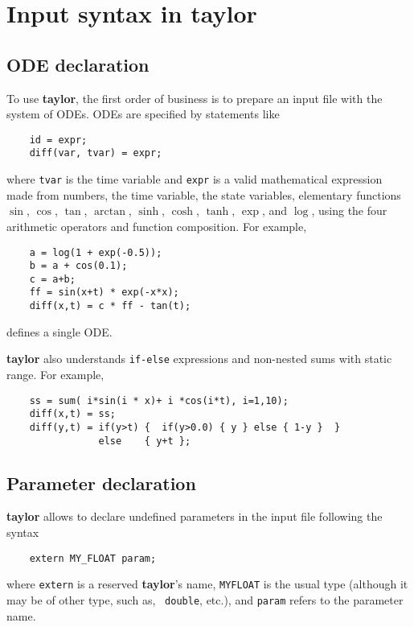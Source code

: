 \documentclass[10pt]{article}
\theoremstyle{remark}
\newcommand{\taylorname}{{\bf taylor}}
\newcommand{\myfloat}{{\tt MY\symbol{95}FLOAT}}
\begin{document}
\section{Input syntax in \taylorname{}} \label{sec:syntax}

\subsection*{ODE declaration}
To use \taylorname{}, the first order of business is to prepare an
input file with the system of ODEs.  ODEs are specified by statements
like
\begin{verbatim}
    id = expr;
    diff(var, tvar) = expr;
\end{verbatim}
where {\tt tvar} is the time variable and {\tt expr} is a valid
mathematical expression made from numbers, the time variable, the
state variables, elementary functions $\sin$, $\cos$, $\tan$,
$\arctan$, $\sinh$, $\cosh$, $\tanh$, $\exp$, and $\log$, using the
four arithmetic operators and function composition. For example,
\begin{verbatim}
    a = log(1 + exp(-0.5));
    b = a + cos(0.1);
    c = a+b;
    ff = sin(x+t) * exp(-x*x);
    diff(x,t) = c * ff - tan(t);
\end{verbatim}
defines a single ODE.

\medskip 

\taylorname{} also understands {\tt if-else} expressions and
non-nested sums with static range. For example,
\begin{verbatim}
    ss = sum( i*sin(i * x)+ i *cos(i*t), i=1,10);
    diff(x,t) = ss;
    diff(y,t) = if(y>t) {  if(y>0.0) { y } else { 1-y }  }
                else    { y+t };
\end{verbatim}

\subsection*{Parameter declaration}
\taylorname{} allows to declare undefined parameters in the input file
following the syntax
\begin{verbatim}
    extern MY_FLOAT param;
\end{verbatim}
where {\tt extern} is a reserved \taylorname{}'s name, \myfloat{} is
the usual type (although it may be of other type, such as, {\tt
  double}, etc.), and {\tt param} refers to the parameter name.
\end{document}

